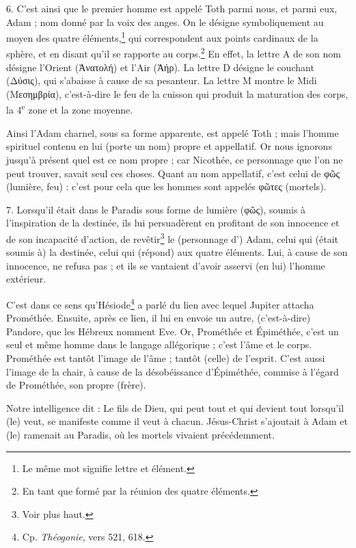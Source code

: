\documentclass[a4paper, 11pt, oneside, polutonikogreek, french]{article}
\begin{document}
6. C'est ainsi que le premier homme est appelé Toth parmi nous, et parmi eux, Adam ; nom donné par la voix des anges. On le désigne symboliquement au moyen des quatre éléments,\footnote{Le même mot signifie lettre et élément.} qui correspondent aux points cardinaux de la sphère, et en disant qu'il se rapporte au corps.\footnote{En tant que formé par la réunion des quatre éléments.} En effet, la lettre A de son nom désigne l'Orient (Ἀνατολή) et l'Air (Ἀήρ). La lettre D désigne le couchant (Δύσις), qui s'abaisse à cause de sa pesanteur. La lettre M montre le Midi (Μεσημβρία), c'est-à-dire le feu de la cuisson qui produit la maturation des corps, la 4\textsuperscript{e} zone et la zone moyenne.

Ainsi l'Adam charnel, sous sa forme apparente, est appelé Toth ; mais l'homme spirituel contenu en lui (porte un nom) propre et appellatif. Or nous ignorons jusqu'à présent quel est ce nom propre ; car Nicothée, ce personnage que l'on ne peut trouver, savait seul ces choses. Quant au nom appellatif, c'est celui de φῶς (lumière, feu) : c'est pour cela que les hommes sont appelés φῶτες (mortels).

7. Lorsqu'il était dans le Paradis sous forme de lumière (φῶς), soumis à l'inspiration de la destinée, ils lui persuadèrent en profitant de son innocence et de son incapacité d'action, de revêtir\footnote{Voir plus haut.} le (personnage d') Adam, celui qui (était soumis à) la destinée, celui qui (répond) aux quatre éléments. Lui, à cause de son innocence, ne refusa pas ; et ils se vantaient d'avoir asservi (en lui) l'homme extérieur.

C'est dans ce sens qu'Hésiode\footnote{Cp. \emph{Théogonie}, vers 521, 618.} a parlé du lien avec lequel Jupiter attacha Prométhée. Ensuite, après ce lien, il lui en envoie un autre, (c'est-à-dire) Pandore, que les Hébreux nomment Eve. Or, Prométhée et Épiméthée, c'est un seul et même homme dans le langage allégorique ; c'est l'âme et le corps. Prométhée est tantôt l'image de l'âme ; tantôt (celle) de l'esprit. C'est aussi l'image de la chair, à cause de la désobéissance d'Épiméthée, commise à l'égard de Prométhée, son propre (frère).

Notre intelligence dit : Le fils de Dieu, qui peut tout et qui devient tout lorsqu'il (le) veut, se manifeste comme il veut à chacun. Jésus-Christ s'ajoutait à Adam et (le) ramenait au Paradis, où les mortels vivaient précédemment.
\end{document}
